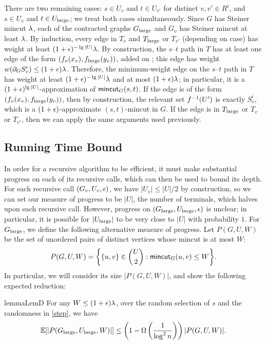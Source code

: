 There are two remaining cases: $s\in U_v$ and $t\in U_{v'}$ for distinct $v,v'\in R^i$, and $s\in U_v$ and $t\in U_{\textup{large}}$; we treat both cases simultaneously. Since $G$ has Steiner mincut $\lambda$, each of the contracted graphs $G_{\textup{large}}$ and $G_v$ has Steiner mincut at least $\lambda$. By induction, every edge in $T_v$ and $T_{\textup{large}}$ or $T_{v'}$ (depending on case) has weight at least $(1+\epsilon)^{-\lg|U|}\lambda$. By construction, the $s$--$t$ path in $T$ has at least one edge of the form $(f_v(x_v),f_{\textup{large}}(y_v))$, added on ; this edge has weight $w(\partial_GS^i_v)\le(1+\epsilon)\lambda$. Therefore, the minimum-weight edge on the $s$--$t$ path in $T$ has weight at least $(1+\epsilon)^{-\lg|U|}\lambda$ and at most $(1+\epsilon)\lambda$; in particular, it is a $(1+\epsilon)^{\lg|U|}$-approximation of $\textsf{\textup{mincut}}_G(s,t)$. If the edge is of the form $(f_v(x_v),f_{\textup{large}}(y_v))$, then by construction, the relevant set $f^{-1}(U')$ is exactly $S^i_v$, which is a $(1+\epsilon)$-approximate $(s,t)$-mincut in $G$. If the edge is in $T_{\textup{large}}$ or $T_v$ or $T_{v'}$, then we can apply the same arguments used previously. %
\EP

\subsection{Running Time Bound}

In order for a recursive algorithm to be efficient, it must make substantial progress on each of its recursive calls, which can then be used to bound its depth. For each recursive call $(G_v,U_v,\epsilon)$, we have $|U_v|\le|U|/2$ by construction, so we can set our measure of progress to be $|U|$, the number of terminals, which halves upon each recursive call.
However, progress on $(G_{\textup{large}},U_{\textup{large}},\epsilon)$ is unclear; in particular, it is possible for $|U_{\textup{large}}|$ to be very close to $|U|$ with probability $1$. For $G_{\textup{large}}$, we define the following alternative measure of progress. Let $P(G,U,W)$ be the set of unordered pairs of distinct vertices whose mincut is at most $W$:
\[ P(G,U,W) = \bigg\{ \{u,v\}\in\binom U2:\textsf{\textup{mincut}}_G(u,v)\le W \bigg\} .\]
In particular, we will consider its size $|P(G,U,W)|$, and show the following expected reduction:

\begin{restatable}{lemma}{LemD}
For any $W\le(1+\epsilon)\lambda$, over the random selection of $s$ and the randomness in \ref{step}, we have
\[ \mathbb E[|P(G_{\textup{large}},U_{\textup{large}},W)|] \le \left(1-\Omega\left(\frac1{\log^2n}\right)\right)|P(G,U,W)| .\]
\end{restatable}

